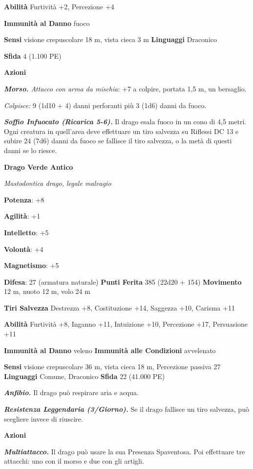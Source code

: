 \begin{multicols}{2}
\textbf{Abilità} Furtività +2, Percezione +4

\textbf{Immunità al Danno} fuoco

\textbf{Sensi} visione crepuscolare 18 m, vista cieca 3 m
\textbf{Linguaggi} Draconico

\textbf{Sfida} 4 (1.100 PE)

\textbf{Azioni}

\emph{\textbf{Morso.} Attacco con arma da mischia}: +7 a colpire,
portata 1,5 m, un bersaglio.

\emph{Colpisce:} 9 (1d10 + 4) danni perforanti più 3 (1d6) danni da
fuoco.

\emph{\textbf{Soffio Infuocato (Ricarica 5-6).}} Il drago esala fuoco in
un cono di 4,5 metri. Ogni creatura in quell'area deve effettuare un
tiro salvezza su Riflessi DC 13 e subire 24 (7d6) danni da fuoco se
fallisce il tiro salvezza, o la metà di questi danni se lo riesce.

\textbf{Drago Verde Antico}

\emph{Mastodontica drago, legale malvagio}

\textbf{Potenza}: +8

\textbf{Agilità}: +1

\textbf{Intelletto}: +5

\textbf{Volontà}: +4

\textbf{Magnetismo}: +5

\textbf{Difesa}: 27 (armatura naturale) \textbf{Punti Ferita}
385 (22d20 + 154) \textbf{Movimento} 12 m, nuoto 12 m, volo 24 m

\textbf{Tiri Salvezza} Destrezza +8, Costituzione +14, Saggezza +10,
Carisma +11

\textbf{Abilità} Furtività +8, Inganno +11, Intuizione +10, Percezione
+17, Persuasione +11

\textbf{Immunità al Danno} veleno \textbf{Immunità alle Condizioni}
avvelenato

\textbf{Sensi} visione crepuscolare 36 m, vista cieca 18 m, Percezione passiva
27 \textbf{Linguaggi} Comune, Draconico \textbf{Sfida} 22 (41.000 PE)

\emph{\textbf{Anfibio.}} Il drago può respirare aria e acqua.

\emph{\textbf{Resistenza Leggendaria (3/Giorno).}} Se il drago fallisce
un tiro salvezza, può scegliere invece di riuscire.

\textbf{Azioni}

\emph{\textbf{Multiattacco.}} Il drago può usare la sua Presenza
Spaventosa. Poi effettuare tre attacchi: uno con il morso e due con gli
artigli.


\end{multicols}
